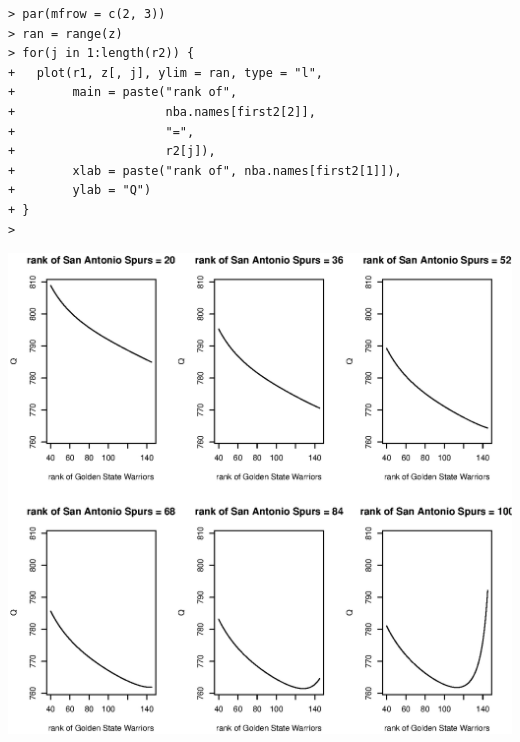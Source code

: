 \documentclass[11pt]{report}
\theoremstyle{definition}
\theoremstyle{remark}
\begin{document}
\begin{enumerate}
\begin{enumerate}
\begin{verbatim}
> par(mfrow = c(2, 3))
> ran = range(z)
> for(j in 1:length(r2)) {
+   plot(r1, z[, j], ylim = ran, type = "l",
+        main = paste("rank of", 
+                     nba.names[first2[2]], 
+                     "=", 
+                     r2[j]),
+        xlab = paste("rank of", nba.names[first2[1]]),
+        ylab = "Q")
+ }
> \end{verbatim}
   \includegraphics[width=\textwidth]{a2_profile.eps}
    \end{enumerate}

\end{enumerate}
\end{document}
